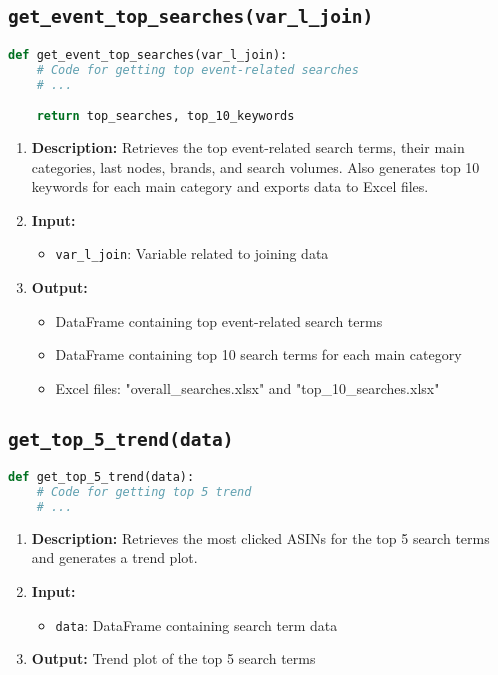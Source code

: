 \subsection{\texttt{get\_event\_top\_searches(var\_l\_join)}}
\begin{lstlisting}[language=Python]
def get_event_top_searches(var_l_join):
    # Code for getting top event-related searches
    # ...

    return top_searches, top_10_keywords
\end{lstlisting}
\begin{enumerate}
    \item \textbf{Description:} Retrieves the top event-related search terms, their main categories, last nodes, brands, and search volumes. Also generates top 10 keywords for each main category and exports data to Excel files.
    \item \textbf{Input:}
          \begin{itemize}
              \item \texttt{var\_l\_join}: Variable related to joining data
          \end{itemize}
    \item \textbf{Output:}
          \begin{itemize}
              \item DataFrame containing top event-related search terms
              \item DataFrame containing top 10 search terms for each main category
              \item Excel files: "overall\_searches.xlsx" and "top\_10\_searches.xlsx"
          \end{itemize}
\end{enumerate}

\subsection{\texttt{get\_top\_5\_trend(data)}}
\begin{lstlisting}[language=Python]
def get_top_5_trend(data):
    # Code for getting top 5 trend
    # ...

\end{lstlisting}
\begin{enumerate}
    \item \textbf{Description:} Retrieves the most clicked ASINs for the top 5 search terms and generates a trend plot.
    \item \textbf{Input:}
          \begin{itemize}
              \item \texttt{data}: DataFrame containing search term data
          \end{itemize}
    \item \textbf{Output:} Trend plot of the top 5 search terms
\end{enumerate}

